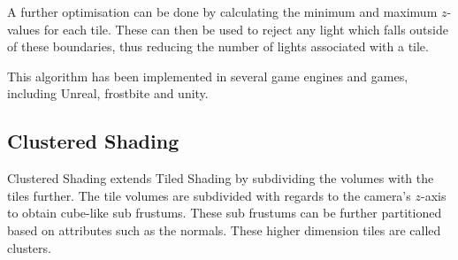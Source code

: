 A further optimisation can be done by calculating the minimum and maximum
$z$-values for each tile. These can then be used to reject any light which falls
outside of these boundaries, thus reducing the number of lights associated with
a tile.

This algorithm has been implemented in several game engines and games\cite{balestra2008technology, swoboda2009deferred, balestra2008technology},
including Unreal\cite{karis2013real}, frostbite\cite{andersson2009parallel, magnusson2011lighting} and unity\cite{pranckevivcius2014physically}.




\subsection{Clustered Shading}

Clustered Shading\cite{olsson2012clustered} extends Tiled Shading by subdividing the
volumes with the tiles further. The tile volumes are subdivided with regards to the
camera's $z$-axis to obtain cube-like sub frustums. These sub frustums can be further
partitioned based on attributes such as the normals. These higher dimension tiles are
called clusters.

